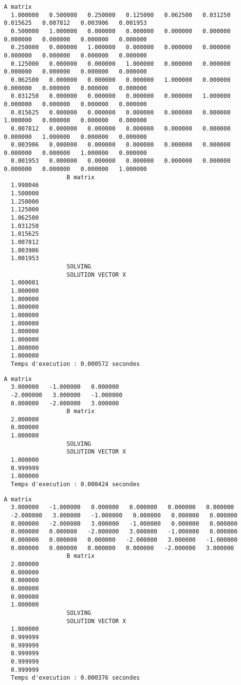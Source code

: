 \documentclass{report}
\begin{document}
\begin{lstlisting}[caption={$A_8X=B$} results, basicstyle=\fontsize{5}{8}\selectfont]
                  A matrix
  1.000000   0.500000   0.250000   0.125000   0.062500   0.031250   0.015625   0.007812   0.003906   0.001953   
  0.500000   1.000000   0.000000   0.000000   0.000000   0.000000   0.000000   0.000000   0.000000   0.000000   
  0.250000   0.000000   1.000000   0.000000   0.000000   0.000000   0.000000   0.000000   0.000000   0.000000   
  0.125000   0.000000   0.000000   1.000000   0.000000   0.000000   0.000000   0.000000   0.000000   0.000000   
  0.062500   0.000000   0.000000   0.000000   1.000000   0.000000   0.000000   0.000000   0.000000   0.000000   
  0.031250   0.000000   0.000000   0.000000   0.000000   1.000000   0.000000   0.000000   0.000000   0.000000   
  0.015625   0.000000   0.000000   0.000000   0.000000   0.000000   1.000000   0.000000   0.000000   0.000000   
  0.007812   0.000000   0.000000   0.000000   0.000000   0.000000   0.000000   1.000000   0.000000   0.000000   
  0.003906   0.000000   0.000000   0.000000   0.000000   0.000000   0.000000   0.000000   1.000000   0.000000   
  0.001953   0.000000   0.000000   0.000000   0.000000   0.000000   0.000000   0.000000   0.000000   1.000000   
                  B matrix
  1.998046   
  1.500000   
  1.250000   
  1.125000   
  1.062500   
  1.031250   
  1.015625   
  1.007812   
  1.003906   
  1.001953   
                  SOLVING
                  SOLUTION VECTOR X 
  1.000001   
  1.000000   
  1.000000   
  1.000000   
  1.000000   
  1.000000   
  1.000000   
  1.000000   
  1.000000   
  1.000000   
  Temps d'execution : 0.000572 secondes
\end{lstlisting}
\begin{lstlisting}[caption={$A_9X=B$} results, basicstyle=\fontsize{8}{10}\selectfont]
                  A matrix
  3.000000   -1.000000   0.000000   
  -2.000000   3.000000   -1.000000   
  0.000000   -2.000000   3.000000   
                  B matrix
  2.000000   
  0.000000   
  1.000000   
                  SOLVING
                  SOLUTION VECTOR X 
  1.000000   
  0.999999   
  1.000000   
  Temps d'execution : 0.000424 secondes
\end{lstlisting}
\begin{lstlisting}[caption={$A_10X=B$} results, basicstyle=\fontsize{8}{10}\selectfont]
                  A matrix
  3.000000   -1.000000   0.000000   0.000000   0.000000   0.000000   
  -2.000000   3.000000   -1.000000   0.000000   0.000000   0.000000   
  0.000000   -2.000000   3.000000   -1.000000   0.000000   0.000000   
  0.000000   0.000000   -2.000000   3.000000   -1.000000   0.000000   
  0.000000   0.000000   0.000000   -2.000000   3.000000   -1.000000   
  0.000000   0.000000   0.000000   0.000000   -2.000000   3.000000   
                  B matrix
  2.000000   
  0.000000   
  0.000000   
  0.000000   
  0.000000   
  1.000000   
                  SOLVING
                  SOLUTION VECTOR X 
  1.000000   
  0.999999   
  0.999999   
  0.999999   
  0.999999   
  0.999999   
  Temps d'execution : 0.000376 secondes
\end{lstlisting}
\end{document}
